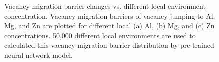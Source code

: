 \begingroup
\begin{figure}[!ht]
  \centering
\caption[Vacancy migration barrier changes vs. different local environment concentration. ]{Vacancy migration barrier changes vs. different local environment concentration. Vacancy migration barriers of vacancy jumping to Al, Mg, and Zn are plotted for different local (a) Al, (b) Mg, and (c) Zn concentrations. 50,000 different local environments are used to calculated this vacancy migration barrier distribution by pre-trained neural network model.}
\label{Chap:Al/Vac:fig:conc_E}
\end{figure}
\endgroup


